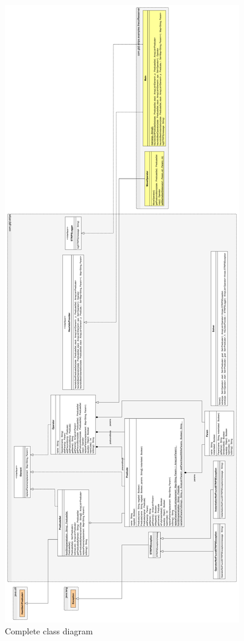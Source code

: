 \documentclass[12pt,a4paper,oneside]{article}
\numberwithin{equation}{section}
\numberwithin{equation}{section}
\theoremstyle{definition}
\begin{document}
\begin{figure}[h!]
	\begin{center}
	\includegraphics[scale=0.16]{gbjl-stripshor}
	\end{center}
	\caption{Complete class diagram}
\end{figure}
\end{document}
